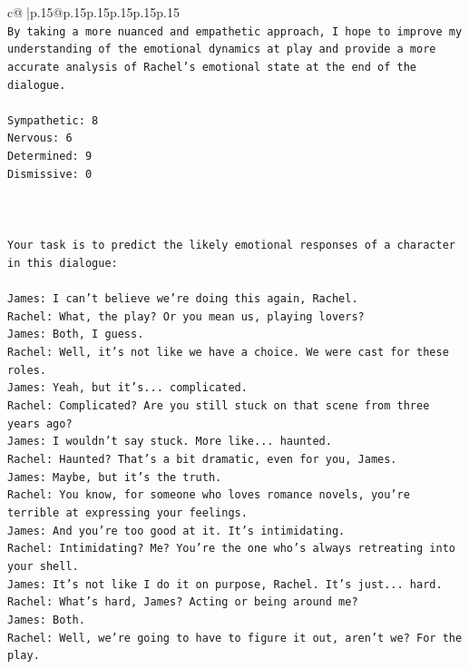 \documentclass{article}
\begin{document}
{\begin{supertabular}{c@{$\;$}|p{.15\linewidth}@{}p{.15\linewidth}p{.15\linewidth}p{.15\linewidth}p{.15\linewidth}p{.15\linewidth}}
{{{\\ 
\texttt{By taking a more nuanced and empathetic approach, I hope to improve my understanding of the emotional dynamics at play and provide a more accurate analysis of Rachel's emotional state at the end of the dialogue.} \\
\\ 
\texttt{Sympathetic: 8} \\
\texttt{Nervous: 6} \\
\texttt{Determined: 9} \\
\texttt{Dismissive: 0} \\
\\ 
\\ 
\\ 
\texttt{Your task is to predict the likely emotional responses of a character in this dialogue:} \\
\\ 
\texttt{James: I can't believe we're doing this again, Rachel. } \\
\texttt{Rachel: What, the play? Or you mean us, playing lovers?} \\
\texttt{James: Both, I guess. } \\
\texttt{Rachel: Well, it's not like we have a choice. We were cast for these roles. } \\
\texttt{James: Yeah, but it's... complicated.} \\
\texttt{Rachel: Complicated? Are you still stuck on that scene from three years ago?} \\
\texttt{James: I wouldn't say stuck. More like... haunted.} \\
\texttt{Rachel: Haunted? That's a bit dramatic, even for you, James.} \\
\texttt{James: Maybe, but it's the truth.} \\
\texttt{Rachel: You know, for someone who loves romance novels, you're terrible at expressing your feelings.} \\
\texttt{James: And you're too good at it. It's intimidating.} \\
\texttt{Rachel: Intimidating? Me? You're the one who's always retreating into your shell.} \\
\texttt{James: It's not like I do it on purpose, Rachel. It's just... hard.} \\
\texttt{Rachel: What's hard, James? Acting or being around me?} \\
\texttt{James: Both.} \\
\texttt{Rachel: Well, we're going to have to figure it out, aren't we? For the play.} \\
}}}
\end{supertabular}}
\end{document}
